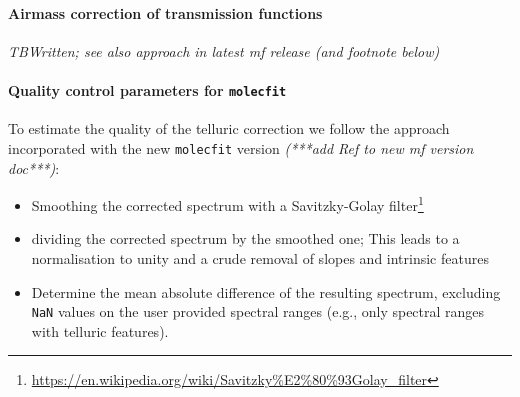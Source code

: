 \paragraph{Airmass correction of transmission functions\newline}\label{ssec:airmass_corr}
\textit{TBWritten; see also approach in latest mf release (and footnote below)}

\paragraph{Quality control parameters for \texttt{molecfit}\newline}\label{ssec_tellcorr_qc_params}
To estimate the quality of the telluric correction we follow the approach incorporated with the new \texttt{molecfit} version \textit{(***add Ref to new mf version doc***)}:
\begin{itemize}
    \item Smoothing the corrected spectrum with a Savitzky-Golay filter\footnote{\url{https://en.wikipedia.org/wiki/Savitzky\%E2\%80\%93Golay_filter}}
    \item dividing the corrected spectrum by the smoothed one; This leads to a normalisation to unity and a crude removal of slopes and intrinsic features
    \item Determine the mean absolute difference of the resulting spectrum, excluding \texttt{NaN} values on the user provided spectral ranges (e.g., only spectral ranges with telluric features). 
\end{itemize}